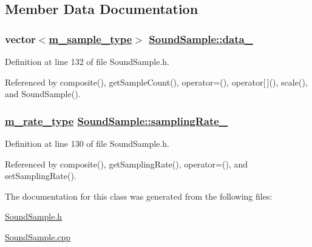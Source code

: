 \subsection{Member Data Documentation}
\hypertarget{classSoundSample_r1}{
\subsubsection[data\_\-]{\setlength{\rightskip}{0pt plus 5cm}vector$<$\hyperlink{Types_8h_a0}{m\_\-sample\_\-type}$>$ \hyperlink{classSoundSample_r1}{Sound\-Sample::data\_\-}}}
\label{classSoundSample_r1}




Definition at line 132 of file Sound\-Sample.h.

Referenced by composite(), get\-Sample\-Count(), operator=(), operator\mbox{[}$\,$\mbox{]}(), scale(), and Sound\-Sample().\hypertarget{classSoundSample_r0}{
\subsubsection[samplingRate\_\-]{\setlength{\rightskip}{0pt plus 5cm}\hyperlink{Types_8h_a4}{m\_\-rate\_\-type} \hyperlink{classSoundSample_r0}{Sound\-Sample::sampling\-Rate\_\-}}}
\label{classSoundSample_r0}




Definition at line 130 of file Sound\-Sample.h.

Referenced by composite(), get\-Sampling\-Rate(), operator=(), and set\-Sampling\-Rate().

The documentation for this class was generated from the following files:\begin{CompactItemize}
\item 
\hyperlink{SoundSample_8h}{Sound\-Sample.h}\item 
\hyperlink{SoundSample_8cpp}{Sound\-Sample.cpp}\end{CompactItemize}
